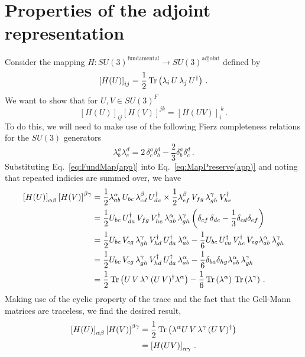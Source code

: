 \section{Properties of the adjoint representation}
\label{app:RepMapProof}
Consider the mapping $H:SU(3)^\text{fundamental}\rightarrow SU(3)^\text{adjoint}$ defined by
%
\begin{equation}
\left[H(U)\right]_{ij} = \frac{1}{2}\operatorname{Tr}\left(\lambda_i \, U \, \lambda_j\, U^\dagger\right)\, .
\label{eq:FundMap(app)}
\end{equation}
%
We want to show that for $U,V\in SU(3)^F$
%
\begin{equation}
\left[H(U)\right]_{ij}\left[H(V)\right]^{jk} = \left[H(U V)\right]_i^{~k}\, .
\label{eq:MapPreserve(app)}
\end{equation}
%
To do this, we will need to make use of the following Fierz completeness relations for the $SU(3)$  generators
%
\begin{equation}
\lambda _ { b } ^ { a } \lambda _ { c } ^ { d } = 2\, \delta _ { c } ^ { a } \delta _ { b } ^ { d } - \frac { 2 } { 3 } \delta _ { b } ^ { a } \delta _ { c } ^ { d }\, .
\end{equation}
%
Substituting Eq.~\eqref{eq:FundMap(app)} into Eq.~\eqref{eq:MapPreserve(app)} and noting that repeated indicies are summed over, we have
\begin{align}
\left[H(U)\right]_{\alpha\beta}\left[H(V)\right]^{\beta\gamma} &= \frac{1}{2} \lambda^\alpha_{ab}\, U_{bc}\,\lambda^\beta_{cd}\, U^\dagger_{da} \times \frac{1}{2} \lambda^\beta_{ef}\, V_{fg}\,\lambda^\gamma_{gh}\, V^\dagger_{he}\nonumber\\
&=\frac{1}{2} U_{bc}\,U^\dagger_{da}\,V_{fg}\,V^\dagger_{he}\,\lambda^\alpha_{ab}\, \lambda^\gamma_{gh} \left(\delta_{cf}\,\delta_{de} - \frac{1}{3}\delta_{cd}\delta_{ef}\right)\nonumber\\
&=\frac{1}{2}U_{bc} \, V_{cg} \, \lambda^\gamma_{gh} \, V^\dagger_{hd} \, U^\dagger_{da} \, \lambda^\alpha_{ab} - \frac{1}{6} U_{bc} \, U^\dagger_{ca} \, V^\dagger_{he} \, V_{eg} \lambda^\alpha_{ab}\, \lambda^\gamma_{gh}\nonumber\\
&= \frac{1}{2}U_{bc} \, V_{cg} \, \lambda^\gamma_{gh} \, V^\dagger_{hd} \, U^\dagger_{da} \, \lambda^\alpha_{ab} - \frac{1}{6}\delta_{ba}\delta_{hg} \lambda^\alpha_{ab}\, \lambda^\gamma_{gh}\nonumber\\
&=\frac{1}{2}\operatorname{Tr}\left(U \, V \, \lambda^\gamma \, (U \, V)^\dagger \lambda^\alpha\right) - \frac{1}{6}\operatorname{Tr}\left(\lambda^\alpha\right) \, \operatorname{Tr}\left(\lambda^\gamma\right)\, .
\end{align}
Making use of the cyclic property of the trace and the fact that the Gell-Mann matrices are traceless, we find the desired result,
%
\begin{align}
\left[H(U)\right]_{\alpha\beta}\left[H(V)\right]^{\beta\gamma} &= \frac{1}{2}\operatorname{Tr}\left(\lambda^\alpha U \, V \, \lambda^\gamma \, (U \, V)^\dagger \right)\nonumber\\
&= \left[H(UV)\right]_{\alpha\gamma} \, .
\end{align}\\

